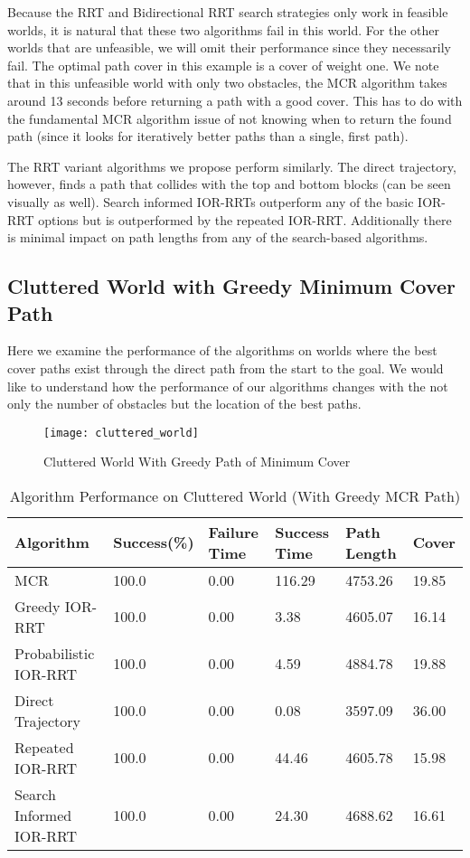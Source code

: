 Because the RRT and Bidirectional RRT search strategies only work in feasible worlds, it is natural that these two algorithms fail in this world. For the other worlds that are unfeasible, we will omit their performance since they necessarily fail. The optimal path cover in this example is a cover of weight one. We note that in this unfeasible world with only two obstacles, the MCR algorithm takes around 13 seconds before returning a path with a good cover. This has to do with the fundamental MCR algorithm issue of not knowing when to return the found path (since it looks for iteratively better paths than a single, first path). 

The RRT variant algorithms we propose perform similarly. The direct trajectory, however, finds a path that collides with the top and bottom blocks (can be seen visually as well). Search informed IOR-RRTs outperform any of the basic IOR-RRT options but is outperformed by the repeated IOR-RRT. Additionally there is minimal impact on path lengths from any of the search-based algorithms.

\subsection{Cluttered World with Greedy Minimum Cover Path} \label{res:cluttered_world}
Here we examine the performance of the algorithms on worlds where the best cover paths exist through the direct path from the start to the goal. We would like to understand how the performance of our algorithms changes with the not only the number of obstacles but the location of the best paths.

\begin{figure}[h!]
    \centering
    \texttt{[image: cluttered\_world]}
    \caption{Cluttered World With Greedy Path of Minimum Cover}
    \label{fig:cluttered_world}
\end{figure}

\begin{table}[h!]
\centering
\begin{tabular}{@{}llllll@{}}
\toprule
Algorithm & Success(\%) & Failure Time & Success Time & Path Length & Cover \\
\midrule
MCR & 100.0 & 0.00 & 116.29 & 4753.26 & 19.85 \\
Greedy IOR-RRT & 100.0 & 0.00 & 3.38 & 4605.07 & 16.14 \\
Probabilistic IOR-RRT & 100.0 & 0.00 & 4.59 & 4884.78 & 19.88 \\
Direct Trajectory & 100.0 & 0.00 & 0.08 & 3597.09 & 36.00 \\
Repeated IOR-RRT & 100.0 & 0.00 & 44.46 & 4605.78 & 15.98 \\
Search Informed IOR-RRT & 100.0 & 0.00 & 24.30 & 4688.62 & 16.61 \\
\bottomrule
\end{tabular}
\caption{Algorithm Performance on Cluttered World (With Greedy MCR Path)}
\label{tab:cluttered_world}
\end{table}

